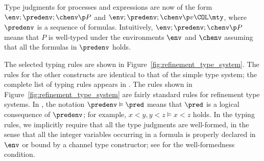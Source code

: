 Type judgments for processes and expressions are
now of the form \( \env;\predenv;\chenv \p P \) and \( \env;\predenv;\chenv \p v\COL\mty \), where \( \predenv \) is a sequence of formulas.
Intuitively, \( \env;\predenv;\chenv \p P \) means that \( P \) is well-typed under the environments \( \env \) and \( \chenv \) assuming that all the formulas in \( \predenv \) holds.

The selected typing rules are shown in Figure~\ref{fig:refinement_type_system}.
The rules for the other constructs are identical to that of the simple type system; 
the complete list of typing rules appears in . %
The rules shown in Figure~\ref{fig:refinement_type_system} are fairly standard rules for refinement type systems.
In , the notation
\(\predenv \vDash \pred\) means that \(\pred\) is a logical consequence of
\(\predenv\); for example, \(x<y, y<z \vDash x<z\) holds.
In the typing rules, we implicitly require that
all the type judgments are well-formed, in the sense that
all the integer variables occurring in a formula is
properly declared in \(\env\) or bound by a channel type constructor;
see 
for the well-formedness condition.
